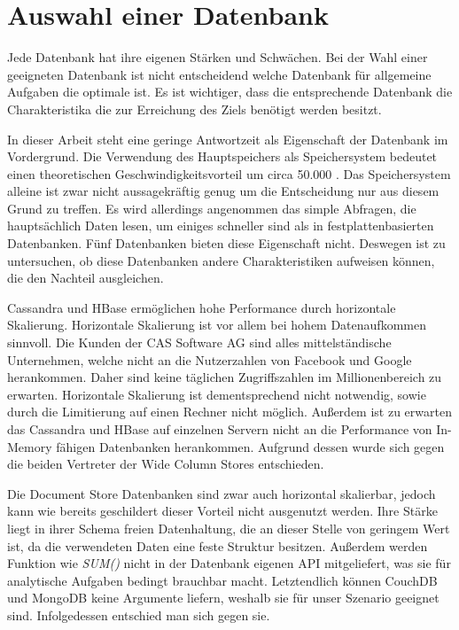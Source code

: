 \section{Auswahl einer Datenbank}
\label{ch:AnalyseDatenbanken:sec:Ergebniss}

Jede Datenbank hat ihre eigenen Stärken und Schwächen. Bei der Wahl einer geeigneten Datenbank ist nicht entscheidend welche Datenbank für allgemeine Aufgaben die optimale ist. Es ist wichtiger, dass die entsprechende Datenbank die Charakteristika die zur Erreichung des Ziels benötigt werden besitzt.

In dieser Arbeit steht eine geringe Antwortzeit als Eigenschaft der Datenbank im Vordergrund. Die Verwendung des Hauptspeichers als Speichersystem bedeutet einen theoretischen Geschwindigkeitsvorteil um circa 50.000 \cite{SWB-394434307}.
Das Speichersystem alleine ist zwar nicht aussagekräftig genug um die Entscheidung nur aus diesem Grund zu treffen. Es wird allerdings angenommen das simple Abfragen, die hauptsächlich Daten lesen, um einiges schneller sind als in festplattenbasierten Datenbanken. Fünf Datenbanken bieten diese Eigenschaft nicht. Deswegen ist zu untersuchen, ob diese Datenbanken andere Charakteristiken aufweisen können, die den Nachteil ausgleichen.

Cassandra und HBase ermöglichen hohe Performance durch horizontale Skalierung. Horizontale Skalierung ist vor allem bei hohem Datenaufkommen sinnvoll. Die Kunden der CAS Software AG sind alles mittelständische Unternehmen, welche nicht an die Nutzerzahlen von Facebook und Google herankommen. Daher sind keine täglichen Zugriffszahlen im Millionenbereich zu erwarten. Horizontale Skalierung ist dementsprechend nicht notwendig, sowie durch die Limitierung auf einen Rechner nicht möglich. Außerdem ist zu erwarten das Cassandra und HBase auf einzelnen Servern nicht an die Performance von In-Memory fähigen Datenbanken herankommen. Aufgrund dessen wurde sich gegen die beiden Vertreter der Wide Column Stores entschieden.

Die Document Store Datenbanken sind zwar auch horizontal skalierbar, jedoch kann wie bereits geschildert dieser Vorteil nicht ausgenutzt werden. Ihre Stärke liegt in ihrer Schema freien Datenhaltung, die an dieser Stelle von geringem Wert ist, da die verwendeten Daten eine feste Struktur besitzen. Außerdem werden Funktion wie \textit{SUM()} nicht in der Datenbank eigenen API mitgeliefert, was sie für analytische Aufgaben bedingt brauchbar macht. Letztendlich können CouchDB und MongoDB keine Argumente liefern, weshalb sie für unser Szenario geeignet sind. Infolgedessen entschied man sich gegen sie.

